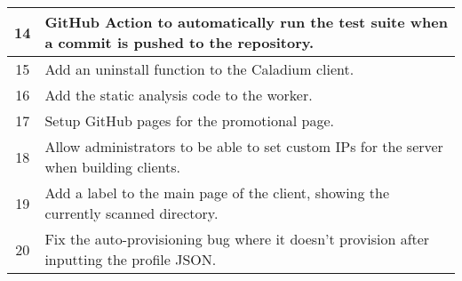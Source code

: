 \begin{appendices}
\begin{tabular}{|c|p{14cm}|}
    \hline
    14 & GitHub Action to automatically run the test suite
    when a commit is pushed to the repository. \\
    \hline
    15 & Add an uninstall function to the Caladium client. \\
    \hline
    16 & Add the static analysis code to the worker. \\
    \hline
    17 & Setup GitHub pages for the promotional page. \\
    \hline
    18 & Allow administrators to be able to set custom IPs
    for the server when building clients. \\
    \hline
    19 & Add a label to the main page of the client,
    showing the currently scanned directory. \\
    \hline
    20 & Fix the auto-provisioning bug where it doesn't
    provision after inputting the profile JSON. \\
\end{tabular}
\end{appendices}
